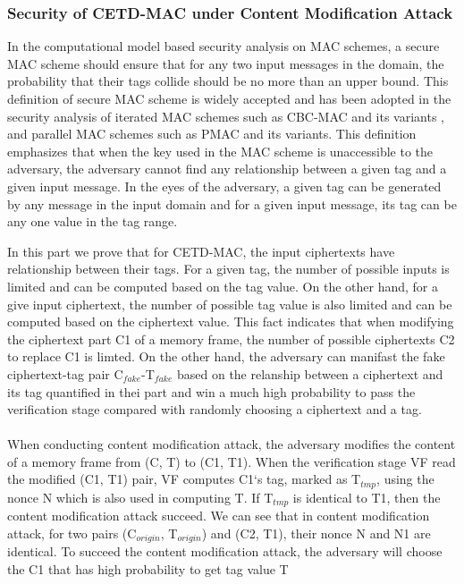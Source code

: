 \documentclass{article}
\begin{document}
\subsubsection{Security of CETD-MAC under Content Modification Attack}
In the computational model based security analysis on MAC schemes, a secure MAC scheme should ensure that for any two input messages in the domain, the probability that their tags collide should be no more than an upper bound. This definition of secure MAC scheme is widely accepted and has been adopted in the security analysis of iterated MAC schemes such as CBC-MAC \cite{} and its variants \cite{}, and parallel MAC schemes such as PMAC \cite{} and its variants\cite{}. This definition emphasizes that when the key used in the MAC scheme is unaccessible to the adversary, the adversary cannot find any relationship between a given tag and a given input message. In the eyes of the adversary, a given tag can be generated by any message in the input domain and for a given input message, its tag can be any one value in the tag range. 

In this part we prove that for CETD-MAC, the input ciphertexts have relationship between their tags.  For a given tag, the number of possible inputs is limited and can be computed based on the tag value. On the other hand, for a give input ciphertext, the number of possible tag value is also limited and can be computed based on the ciphertext value. This fact indicates that when modifying the ciphertext part C1 of a memory frame, the number of possible ciphertexts C2 to replace C1 is limted. On the other hand, the adversary can manifast the fake ciphertext-tag pair C$_{fake}$-T$_{fake}$ based on the relanship between a ciphertext and its tag quantified in thei part and win a much high probability to pass the verification stage compared with randomly choosing a ciphertext and a tag. 

\paragraph{ }
When conducting content modification attack, the adversary modifies the content of a memory frame from (C, T) to (C1, T1). When the verification stage VF read the modified (C1, T1) pair, VF computes C1`s tag, marked as T$_{tmp}$, using the nonce N which is also used in computing T. If T$_{tmp}$ is identical to T1, then the content modification attack succeed. We can see that in content modification attack, for two pairs (C$_{origin}$, T$_{origin}$) and (C2, T1), their nonce N and N1 are identical. To succeed the content modification attack, the adversary will choose the C1 that has high probability to get tag value T    
\end{document}
